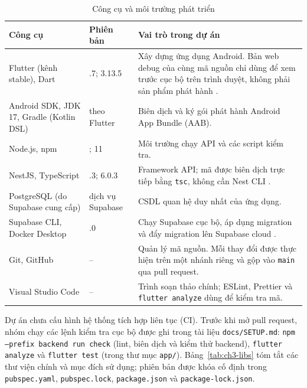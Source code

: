 \begin{table}[H]
	\centering
	\caption{Công cụ và môi trường phát triển}
	\label{tab:ch3-tools}
	\small
	\begin{tabularx}{\textwidth}{@{}>{\raggedright\arraybackslash}p{4.2cm}>{\raggedright\arraybackslash}p{2.6cm}X@{}}
		\toprule
		\textbf{Công cụ} & \textbf{Phiên bản} & \textbf{Vai trò trong dự án}\\
		\midrule
		Flutter (kênh stable), Dart & 3.47.7; 3.13.5 & Xây dựng ứng dụng Android. Bản web debug của cùng mã nguồn chỉ dùng để xem trước cục bộ trên trình duyệt, không phải sản phẩm phát hành \parencite{ch3-flutter-docs}.\\
		Android SDK, JDK 17, Gradle (Kotlin DSL) & theo Flutter & Biên dịch và ký gói phát hành Android App Bundle (AAB).\\
		Node.js, npm & 24; 11 & Môi trường chạy API và các script kiểm tra.\\
		NestJS, TypeScript & 12.1.3; 6.0.3 & Framework API; mã được biên dịch trực tiếp bằng \texttt{tsc}, không cần Nest CLI \parencite{ch3-nestjs-docs}.\\
		PostgreSQL (do Supabase cung cấp) & dịch vụ Supabase & CSDL quan hệ duy nhất của ứng dụng.\\
		Supabase CLI, Docker Desktop & 2.121.0 & Chạy Supabase cục bộ, áp dụng migration và đẩy migration lên Supabase cloud \parencite{ch3-supabase-migrations}.\\
		Git, GitHub & -- & Quản lý mã nguồn. Mỗi thay đổi được thực hiện trên một nhánh riêng và gộp vào \texttt{main} qua pull request.\\
		Visual Studio Code & -- & Trình soạn thảo chính; ESLint, Prettier và \texttt{flutter analyze} dùng để kiểm tra mã.\\
		\bottomrule
	\end{tabularx}
\end{table}

Dự án chưa cấu hình hệ thống tích hợp liên tục (CI). Trước khi mở pull request, nhóm chạy các lệnh kiểm tra cục bộ được ghi trong tài liệu \texttt{docs/\allowbreak{}SETUP.\allowbreak{}md}: \texttt{npm --prefix backend run check} (lint, biên dịch và kiểm thử backend), \texttt{flutter analyze} và \texttt{flutter test} (trong thư mục \texttt{app/}). Bảng~\ref{tab:ch3-libs} tóm tắt các thư viện chính và mục đích sử dụng; phiên bản được khóa cố định trong \texttt{pubspec.\allowbreak{}yaml}, \texttt{pubspec.\allowbreak{}lock}, \texttt{package.\allowbreak{}json} và \texttt{package-\allowbreak{}lock.\allowbreak{}json}.

